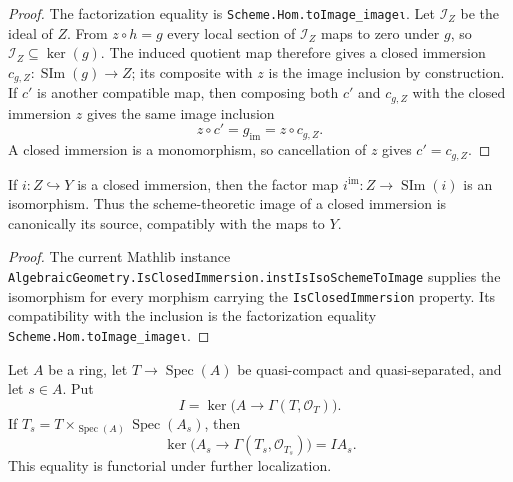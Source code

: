 \begin{proof}
  The factorization equality is \texttt{Scheme.Hom.toImage_imageι}.
  Let $\mathcal I_Z$ be the ideal of $Z$.  From
  $z\circ h=g$ every local section of $\mathcal I_Z$ maps to zero under $g$,
  so $\mathcal I_Z\subseteq\operatorname{ker}(g)$.  The induced quotient map
  therefore gives a closed immersion
  $c_{g,Z}\colon\operatorname{SIm}(g)\to Z$; its composite with $z$ is the
  image inclusion by construction.  If $c'$ is another compatible map, then
  composing both $c'$ and $c_{g,Z}$ with the closed immersion $z$ gives the
  same image inclusion
  \[
    z\circ c'=g_{\mathrm{im}}=z\circ c_{g,Z}.
  \]
  A closed immersion is a monomorphism, so cancellation of $z$ gives
  $c'=c_{g,Z}$.
  \end{proof}

\begin{lemma}
  \label{lemma:nagata-scheme-image-of-closed-immersion}

  If $i\colon Z\hookrightarrow Y$ is a closed immersion, then the factor map
  $i^{\mathrm{im}}\colon Z\to\operatorname{SIm}(i)$ is an isomorphism.  Thus
  the scheme-theoretic image of a closed immersion is canonically its source,
  compatibly with the maps to $Y$.
\end{lemma}

\begin{proof}
  The current Mathlib instance
  \texttt{AlgebraicGeometry.IsClosedImmersion.instIsIsoSchemeToImage}
  supplies the isomorphism for every morphism carrying the
  \texttt{IsClosedImmersion} property.  Its compatibility with the inclusion
  is the factorization equality
  \texttt{Scheme.Hom.toImage\_imageι}.
\end{proof}

\begin{lemma}
  \label{lemma:nagata-affine-image-kernel-localization}

  Let $A$ be a ring, let $T\to\operatorname{Spec}(A)$ be quasi-compact and
  quasi-separated, and let $s\in A$.  Put
  \[
    I=\ker\bigl(A\longrightarrow\Gamma(T,\mathcal O_T)\bigr).
  \]
  If $T_s=T\times_{\operatorname{Spec}(A)}\operatorname{Spec}(A_s)$, then
  \[
    \ker\bigl(A_s\longrightarrow\Gamma(T_s,\mathcal O_{T_s})\bigr)=IA_s.
  \]
  This equality is functorial under further localization.
\end{lemma}

